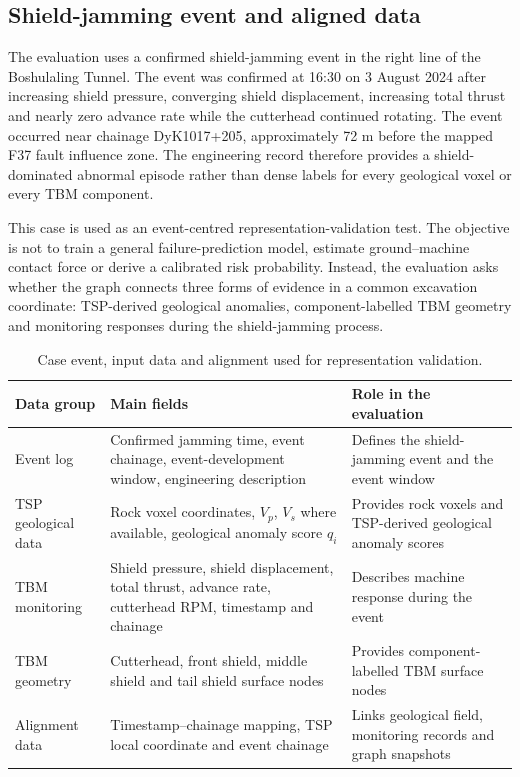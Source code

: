 \subsection{Shield-jamming event and aligned data}
The evaluation uses a confirmed shield-jamming event in the right line of the Boshulaling Tunnel. The event was confirmed at 16:30 on 3 August 2024 after increasing shield pressure, converging shield displacement, increasing total thrust and nearly zero advance rate while the cutterhead continued rotating. The event occurred near chainage DyK1017+205, approximately 72 m before the mapped F37 fault influence zone. The engineering record therefore provides a shield-dominated abnormal episode rather than dense labels for every geological voxel or every TBM component.

This case is used as an event-centred representation-validation test. The objective is not to train a general failure-prediction model, estimate ground--machine contact force or derive a calibrated risk probability. Instead, the evaluation asks whether the graph connects three forms of evidence in a common excavation coordinate: TSP-derived geological anomalies, component-labelled TBM geometry and monitoring responses during the shield-jamming process.

\begin{table}[!htbp]
\centering
\caption{Case event, input data and alignment used for representation validation.}
\label{tab:case_data}
\small
\begin{tabular}{@{}p{}p{}p{}@{}}
\toprule
Data group & Main fields & Role in the evaluation \\
\midrule
Event log & Confirmed jamming time, event chainage, event-development window, engineering description & Defines the shield-jamming event and the event window \\
TSP geological data & Rock voxel coordinates, $V_p$, $V_s$ where available, geological anomaly score $q_i$ & Provides rock voxels and TSP-derived geological anomaly scores \\
TBM monitoring & Shield pressure, shield displacement, total thrust, advance rate, cutterhead RPM, timestamp and chainage & Describes machine response during the event \\
TBM geometry & Cutterhead, front shield, middle shield and tail shield surface nodes & Provides component-labelled TBM surface nodes \\
Alignment data & Timestamp--chainage mapping, TSP local coordinate and event chainage & Links geological field, monitoring records and graph snapshots \\
\bottomrule
\end{tabular}
\end{table}

